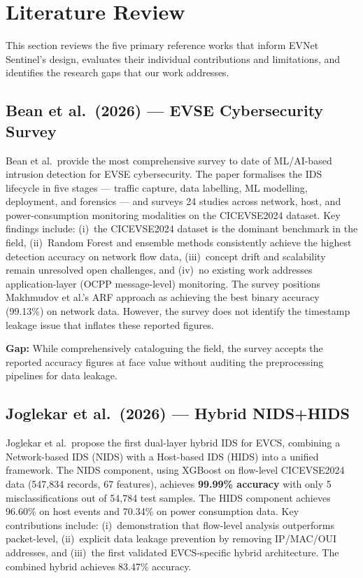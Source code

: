 \documentclass[conference]{IEEEtran}
\begin{document}
\section{Literature Review}

This section reviews the five primary reference works that inform EVNet Sentinel's design, evaluates their individual contributions and limitations, and identifies the research gaps that our work addresses.

\subsection{Bean et al.\ (2026) --- EVSE Cybersecurity Survey \cite{b1}}

Bean et al.\ provide the most comprehensive survey to date of ML/AI-based intrusion detection for EVSE cybersecurity. The paper formalises the IDS lifecycle in five stages --- traffic capture, data labelling, ML modelling, deployment, and forensics --- and surveys 24 studies across network, host, and power-consumption monitoring modalities on the CICEVSE2024 dataset. Key findings include: (i)~the CICEVSE2024 dataset is the dominant benchmark in the field, (ii)~Random Forest and ensemble methods consistently achieve the highest detection accuracy on network flow data, (iii)~concept drift and scalability remain unresolved open challenges, and (iv)~no existing work addresses application-layer (OCPP message-level) monitoring. The survey positions Makhmudov et al.'s ARF approach as achieving the best binary accuracy (99.13\%) on network data. However, the survey does not identify the timestamp leakage issue that inflates these reported figures.

\textbf{Gap:} While comprehensively cataloguing the field, the survey accepts the reported accuracy figures at face value without auditing the preprocessing pipelines for data leakage.

\subsection{Joglekar et al.\ (2026) --- Hybrid NIDS+HIDS \cite{b2}}

Joglekar et al.\ propose the first dual-layer hybrid IDS for EVCS, combining a Network-based IDS (NIDS) with a Host-based IDS (HIDS) into a unified framework. The NIDS component, using XGBoost on flow-level CICEVSE2024 data (547,834 records, 67 features), achieves \textbf{99.99\% accuracy} with only 5 misclassifications out of 54,784 test samples. The HIDS component achieves 96.60\% on host events and 70.34\% on power consumption data. Key contributions include: (i)~demonstration that flow-level analysis outperforms packet-level, (ii)~explicit data leakage prevention by removing IP/MAC/OUI addresses, and (iii)~the first validated EVCS-specific hybrid architecture. The combined hybrid achieves 83.47\% accuracy.
\end{document}
